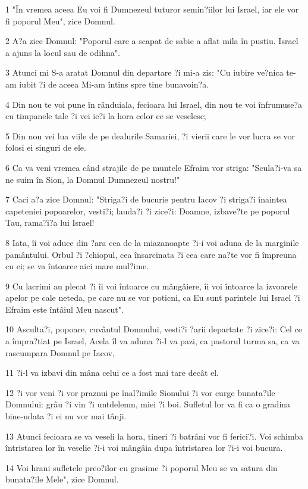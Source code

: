 \par 1 "În vremea aceea Eu voi fi Dumnezeul tuturor semin?iilor lui Israel, iar ele vor fi poporul Meu", zice Domnul.
\par 2 A?a zice Domnul: "Poporul care a scapat de sabie a aflat mila în pustiu. Israel a ajuns la locul sau de odihna".
\par 3 Atunci mi S-a aratat Domnul din departare ?i mi-a zis: "Cu iubire ve?nica te-am iubit ?i de aceea Mi-am întins spre tine bunavoin?a.
\par 4 Din nou te voi pune în rânduiala, fecioara lui Israel, din nou te voi înfrumuse?a cu timpanele tale ?i vei ie?i la hora celor ce se veselesc;
\par 5 Din nou vei lua viile de pe dealurile Samariei, ?i vierii care le vor lucra se vor folosi ei singuri de ele.
\par 6 Ca va veni vremea când strajile de pe muntele Efraim vor striga: "Scula?i-va sa ne suim în Sion, la Domnul Dumnezeul nostru!"
\par 7 Caci a?a zice Domnul: "Striga?i de bucurie pentru Iacov ?i striga?i înaintea capeteniei popoarelor, vesti?i; lauda?i ?i zice?i: Doamne, izbave?te pe poporul Tau, rama?i?a lui Israel!
\par 8 Iata, îi voi aduce din ?ara cea de la miazanoapte ?i-i voi aduna de la marginile pamântului. Orbul ?i ?chiopul, cea însarcinata ?i cea care na?te vor fi împreuna cu ei; se va întoarce aici mare mul?ime.
\par 9 Cu lacrimi au plecat ?i îi voi întoarce cu mângâiere, îi voi întoarce la izvoarele apelor pe cale neteda, pe care nu se vor poticni, ca Eu sunt parintele lui Israel ?i Efraim este întâiul Meu nascut".
\par 10 Asculta?i, popoare, cuvântul Domnului, vesti?i ?arii departate ?i zice?i: Cel ce a împra?tiat pe Israel, Acela îl va aduna ?i-l va pazi, ca pastorul turma sa, ca va rascumpara Domnul pe Iacov,
\par 11 ?i-l va izbavi din mâna celui ce a fost mai tare decât el.
\par 12 ?i vor veni ?i vor praznui pe înal?imile Sionului ?i vor curge bunata?ile Domnului: grâu ?i vin ?i untdelemn, miei ?i boi. Sufletul lor va fi ca o gradina bine-udata ?i ei nu vor mai tânji.
\par 13 Atunci fecioara se va veseli la hora, tineri ?i batrâni vor fi ferici?i. Voi schimba întristarea lor în veselie ?i-i voi mângâia dupa întristarea lor ?i-i voi bucura.
\par 14 Voi hrani sufletele preo?ilor cu grasime ?i poporul Meu se va satura din bunata?ile Mele", zice Domnul.
